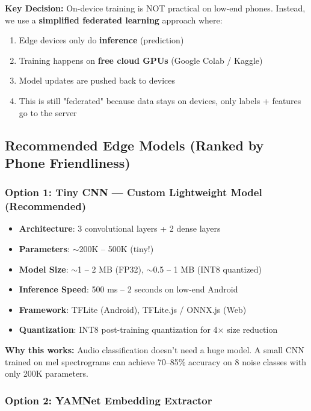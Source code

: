 \documentclass[11pt,a4paper]{article}
\begin{document}
\begin{highlightbox}
\textbf{Key Decision:} On-device training is NOT practical on low-end phones. Instead, we use a \textbf{simplified federated learning} approach where:
\begin{enumerate}
    \item Edge devices only do \textbf{inference} (prediction)
    \item Training happens on \textbf{free cloud GPUs} (Google Colab / Kaggle)
    \item Model updates are pushed back to devices
    \item This is still "federated" because data stays on devices, only labels + features go to the server
\end{enumerate}
\end{highlightbox}

\subsection{Recommended Edge Models (Ranked by Phone Friendliness)}

\subsubsection{Option 1: Tiny CNN — Custom Lightweight Model (Recommended)}

\begin{itemize}[leftmargin=*,noitemsep]
    \item \textbf{Architecture}: 3 convolutional layers + 2 dense layers
    \item \textbf{Parameters}: $\sim$200K -- 500K (tiny!)
    \item \textbf{Model Size}: $\sim$1 -- 2 MB (FP32), $\sim$0.5 -- 1 MB (INT8 quantized)
    \item \textbf{Inference Speed}: 500 ms -- 2 seconds on low-end Android
    \item \textbf{Framework}: TFLite (Android), TFLite.js / ONNX.js (Web)
    \item \textbf{Quantization}: INT8 post-training quantization for 4$\times$ size reduction
\end{itemize}

\textbf{Why this works:} Audio classification doesn't need a huge model. A small CNN trained on mel spectrograms can achieve 70--85\% accuracy on 8 noise classes with only 200K parameters.

\subsubsection{Option 2: YAMNet Embedding Extractor}
\end{document}

